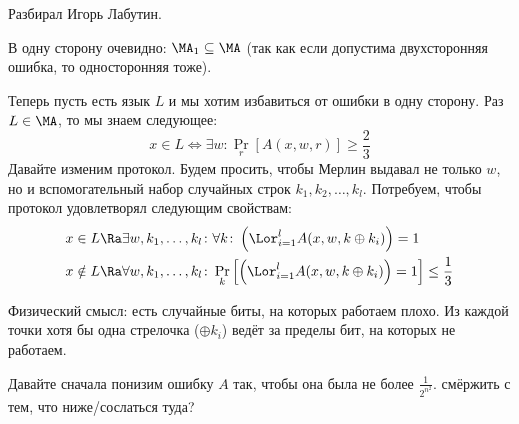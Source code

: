 	Разбирал Игорь Лабутин.

	В одну сторону очевидно: $\MA_1 \subseteq \MA$ (так как если допустима двухсторонняя ошибка,
	то односторонняя тоже).

	Теперь пусть есть язык $L$ и мы хотим избавиться от ошибки в одну сторону.
	Раз $L \in \MA$, то мы знаем следующее:
	\[ x \in L \iff \exists w \colon \Pr\limits_r[A(x, w, r)] \ge \frac 23 \]
	Давайте изменим протокол.
	Будем просить, чтобы Мерлин выдавал не только $w$, но и вспомогательный набор случайных строк $k_1, k_2, \dots, k_l$.
	Потребуем, чтобы протокол удовлетворял следующим свойствам:
	\begin{align*}
		x \in L &\Ra \exists w, k_1, \dots, k_l \colon \forall k \colon \left(\Lor_{i=1}^l A(x, w, k \oplus k_i)\right) = 1 \\
		x \notin L &\Ra \forall w, k_1, \dots, k_l \colon \Pr\limits_k \left[ \left(\Lor_{i=1}^l A(x, w, k \oplus k_i)\right) = 1\right] \le \frac 1 3 \\
	\end{align*}
	\begin{Rem}
		Физический смысл: есть случайные биты, на которых работаем плохо.
		Из каждой точки хотя бы одна стрелочка ($\oplus k_i$) ведёт за пределы бит, на которых не работаем.
	\end{Rem}
	Давайте сначала понизим ошибку $A$ так, чтобы она была не более $\frac{1}{2^{n^2}}$.
	\TODO смёржить с тем, что ниже/сослаться туда?

